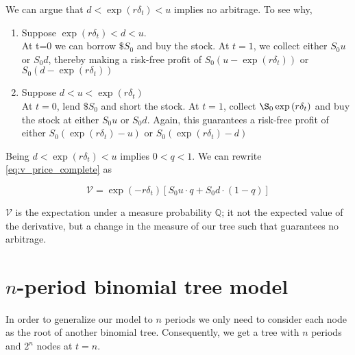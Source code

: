 \documentclass{article}
\begin{document}
We can argue that $d < \exp{(r\delta_t)} < u$ implies no arbitrage. To see why, 
\begin{enumerate}
\item Suppose $\exp{(r\delta_t)} < d < u$.\\
    At t=0 we can borrow $\$S_0$ and buy the stock. At $t=1$, we collect either $S_0u$ or $S_0d$, thereby making a risk-free profit of $S_0(u - \exp{(r\delta_t)})$ or $S_0(d - \exp{(r\delta_t)})$

\item Suppose $d < u < \exp{(r\delta_t)}$\\
    At $t=0$, lend $\$S_0$ and short the stock. At $t=1$, collect $\S_0\exp{(r\delta_t)}$ and buy the stock at either $S_0u$ or $S_0d$. Again, this guarantees a risk-free profit of either $S_0(\exp{(r\delta_t)} - u)$ or $S_0(\exp{(r\delta_t)} - d)$
\end{enumerate}

Being $d < \exp{(r\delta_t)} < u$ implies $0 < q < 1$. We can rewrite \ref{eq:v_price_complete} as

\begin{equation} \label{eq:v_price}
    \mathcal{V} = \exp{(-r\delta_t)}[S_0u\cdot q + S_0d \cdot (1-q)]
\end{equation}

$\mathcal V$ is the expectation under a measure probability $\mathbb Q$; it not the expected value of the derivative, but a change in the measure of our tree such that guarantees no arbitrage.


\section{$n$-period binomial tree model}
In order to generalize our model to $n$ periods we only need to consider each node as the root of another binomial tree. Consequently, we get a tree with $n$ periods and $2^n$ nodes at $t=n$.
\end{document}
